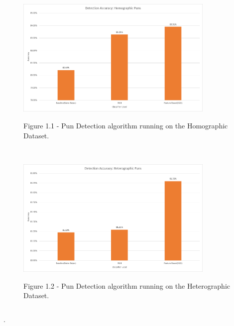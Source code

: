 \documentclass[final]{beamer}
\newlength{\onecolwid}
\newlength{\twocolwid}
\begin{document}
\begin{frame}[t]
\begin{columns}[t]
\begin{column}{\twocolwid}
\begin{columns}[t,totalwidth=\twocolwid]
\begin{column}{\onecolwid}
					\begin{figure}
						\includegraphics[width=0.85\textwidth]{HomographicDetection.png}\\
						\caption{Figure 1.1 - Pun Detection algorithm running on the Homographic Dataset.}
					\end{figure}
					\\
					\vspace{20mm}
					\begin{figure}
						\includegraphics[width=0.85\textwidth]{HeterographicDetection.png}\\
						\caption{Figure 1.2 - Pun Detection algorithm running on the Heterographic Dataset.}
					\end{figure}
				\end{column}
			\end{columns}
			\begin{block}
				{.}
			\end{block}
			\begin{columns}[t,totalwidth=\twocolwid]
				\begin{column}{\onecolwid} %


\end{column}
\end{columns}
\end{column}
\end{columns}
\end{frame}
\end{document}
